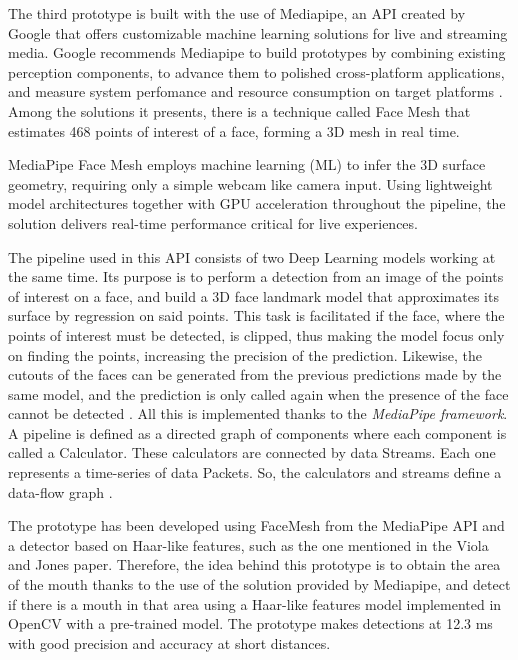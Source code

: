 The third prototype is built with the use of Mediapipe, an API created by Google that offers customizable machine learning solutions for live and streaming media.
Google recommends Mediapipe to build prototypes by combining existing perception components, to advance them to polished cross-platform applications, and measure system perfomance and resource consumption on target platforms \cite{mediapipe}. Among the solutions it presents, there is a technique called Face Mesh that estimates 468 points of interest of a face, forming a 3D mesh in real time.

\vspace{-0.3cm}
MediaPipe Face Mesh employs machine learning (ML) to infer the 3D surface geometry, requiring only a simple webcam like camera input. Using lightweight model architectures together with GPU acceleration throughout the pipeline, the solution delivers real-time performance critical for live experiences.

\vspace{-0.3cm}
The pipeline used in this API consists of two Deep Learning models working at the same time. Its purpose is to perform a detection from an image of the points of interest on a face, and build a 3D face landmark model that approximates its surface by regression on said points. This task is facilitated if the face, where the points of interest must be detected, is clipped, thus making the model focus only on finding the points, increasing the precision of the prediction. Likewise, the cutouts of the faces can be generated from the previous predictions made by the same model, and the prediction is only called again when the presence of the face cannot be detected \cite{faceMesh}. All this is implemented thanks to the \textit{MediaPipe framework}. A pipeline is defined as a directed graph of components where each component is called a Calculator. These calculators are connected by data Streams. Each one represents a time-series of data Packets. So, the calculators and streams define a data-flow graph \cite{mediapipe}.

\vspace{-0.3cm}
The prototype has been developed using FaceMesh from the MediaPipe API and a detector based on Haar-like features, such as the one mentioned in the Viola and Jones paper. Therefore, the idea behind this prototype is to obtain the area of the mouth thanks to the use of the solution provided by Mediapipe, and detect if there is a mouth in that area using a Haar-like features model implemented in OpenCV with a pre-trained model. The prototype makes detections at 12.3 ms with good precision and accuracy at short distances. 


